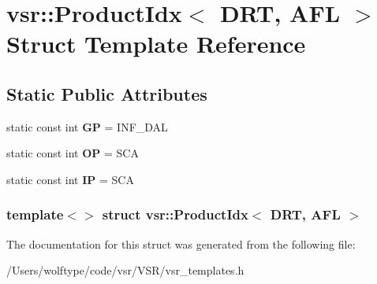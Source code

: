 \hypertarget{structvsr_1_1_product_idx_3_01_d_r_t_00_01_a_f_l_01_4}{\section{vsr\-:\-:Product\-Idx$<$ D\-R\-T, A\-F\-L $>$ Struct Template Reference}
\label{structvsr_1_1_product_idx_3_01_d_r_t_00_01_a_f_l_01_4}
}
\subsection*{Static Public Attributes}
\begin{DoxyCompactItemize}
\item 
\hypertarget{structvsr_1_1_product_idx_3_01_d_r_t_00_01_a_f_l_01_4_a899a10dd7559ef66aa45a7f5472461d8}{static const int {\bfseries G\-P} = I\-N\-F\-\_\-\-D\-A\-L}\label{structvsr_1_1_product_idx_3_01_d_r_t_00_01_a_f_l_01_4_a899a10dd7559ef66aa45a7f5472461d8}

\item 
\hypertarget{structvsr_1_1_product_idx_3_01_d_r_t_00_01_a_f_l_01_4_adb1dbe45303da749d601c573a99d4cda}{static const int {\bfseries O\-P} = S\-C\-A}\label{structvsr_1_1_product_idx_3_01_d_r_t_00_01_a_f_l_01_4_adb1dbe45303da749d601c573a99d4cda}

\item 
\hypertarget{structvsr_1_1_product_idx_3_01_d_r_t_00_01_a_f_l_01_4_a981832e4cbce03817048e199455413c8}{static const int {\bfseries I\-P} = S\-C\-A}\label{structvsr_1_1_product_idx_3_01_d_r_t_00_01_a_f_l_01_4_a981832e4cbce03817048e199455413c8}

\end{DoxyCompactItemize}
\subsubsection*{template$<$$>$ struct vsr\-::\-Product\-Idx$<$ D\-R\-T, A\-F\-L $>$}



The documentation for this struct was generated from the following file\-:\begin{DoxyCompactItemize}
\item 
/\-Users/wolftype/code/vsr/\-V\-S\-R/vsr\-\_\-templates.\-h\end{DoxyCompactItemize}
